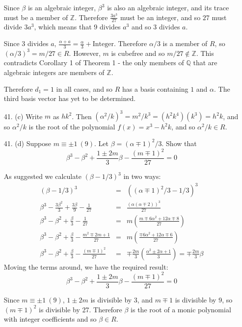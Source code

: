 \documentclass{article}
\newcommand{\Q}[0]{\mathbb{Q}}
\newcommand{\Z}[0]{\mathbb{Z}}
\begin{document}
\begin{enumerate}
Since $\beta$ is an algebraic integer, $\beta^3$ is also an algebraic integer, and its trace must be a member of $\Z$.  Therefore $\frac{3a^3}{27}$ must be an integer, and so $27$ must divide $3a^3$, which means that $9$ divides $a^3$ and so 3 divides $a$.

Since 3 divides $a$, $\frac{\alpha + a}{3} = \frac{\alpha}{3} + \text{Integer}$.  Therefore $\alpha/3$ is a member of $R$, so $(\alpha / 3)^3 = m / 27 \in R$.  However, $m$ is cubefree and so $m / 27 \not \in \Z$.  This contradicts Corollary 1 of Theorem 1 - the only members of $\Q$ that are algebraic integers are members of $\Z$.

Therefore $d_1 = 1$ in all cases, and so $R$ has a basis containing $1$ and $\alpha$.  The third basis vector has yet to be determined.

\item[41. (c)] Write $m$ as $hk^2$.  Then $(\alpha^2 / k)^3 = m^2 / k^3 = (h^2 k^4)(k^3) = h^2 k$, and so $\alpha^2 / k$ is the root of the polynomial $f(x) = x^3 - h^2k$, and so $\alpha^2 / k \in R$.

\item[41. (d)] Suppose $m \equiv \pm 1\ (9)$.  Let $\beta = (\alpha \mp 1)^2 / 3$.  Show that
\[ \beta^3 - \beta^2 + \frac{1 \pm 2m}{3} \beta - \frac{(m \mp 1)^2}{27} = 0 \]

As suggested we calculate $(\beta - 1/3)^3$ in two ways:
\begin{eqnarray*}
(\beta - 1/3)^3 &=& ((\alpha \mp 1)^2 / 3 - 1/3)^3 \\
\beta^3 - \frac{3\beta^2}{3} + \frac{3\beta}{9} - \frac{1}{27} &=& \frac{(\alpha(\alpha \mp 2))^3}{27} \\
\beta^3 - \beta^2 + \frac{\beta}{3} - \frac{1}{27} &=& m\left(\frac{m \mp 6\alpha^2 + 12\alpha \mp 8}{27}\right)\\
\beta^3 - \beta^2 + \frac{\beta}{3} - \frac{m^2 \mp 2m + 1}{27} &=& m\left( \frac{\mp 6\alpha^2 + 12\alpha \mp 6}{27}\right)\\
\beta^3 - \beta^2 + \frac{\beta}{3} - \frac{(m \mp 1)^2}{27} &=& \mp \frac{2m}{3}\left( \frac{\alpha^2 \pm 2\alpha + 1}{3}\right) = \mp \frac{2m}{3}\beta
\end{eqnarray*}
Moving the terms around, we have the required result:
\[ \beta^3 - \beta^2 + \frac{1 \pm 2m}{3}\beta - \frac{(m \mp 1)^2}{27} = 0 \]

Since $m \equiv \pm 1\ (9)$, $1 \pm 2m$ is divisible by 3, and $m \mp 1$ is divisible by 9, so $(m \mp 1)^2$ is divisible by 27.  Therefore $\beta$ is the root of a monic polynomial with integer coefficients and so $\beta \in R$.


\end{enumerate}
\end{document}
